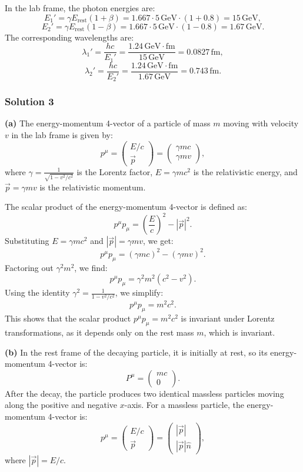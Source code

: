 \documentclass{article}
\begin{document}
In the lab frame, the photon energies are:
\[
E_1' = \gamma E_{\text{rest}}(1 + \beta) = 1.667 \cdot 5 \, \text{GeV} \cdot (1 + 0.8) = 15 \, \text{GeV},
\]
\[
E_2' = \gamma E_{\text{rest}}(1 - \beta) = 1.667 \cdot 5 \, \text{GeV} \cdot (1 - 0.8) = 1.67 \, \text{GeV}.
\]
The corresponding wavelengths are:
\[
\lambda_1' = \frac{hc}{E_1'} = \frac{1.24 \, \text{GeV} \cdot \text{fm}}{15 \, \text{GeV}} = 0.0827 \, \text{fm},
\]
\[
\lambda_2' = \frac{hc}{E_2'} = \frac{1.24 \, \text{GeV} \cdot \text{fm}}{1.67 \, \text{GeV}} = 0.743 \, \text{fm}.
\]

\subsubsection{Solution 3}
\textbf{(a)} The energy-momentum 4-vector of a particle of mass \(m\) moving with velocity \(v\) in the lab frame is given by:
\[
p^\mu = \begin{pmatrix} E/c \\ \vec{p} \end{pmatrix} = \begin{pmatrix} \gamma mc \\ \gamma mv \end{pmatrix},
\]
where \(\gamma = \frac{1}{\sqrt{1-v^2/c^2}}\) is the Lorentz factor, \(E = \gamma mc^2\) is the relativistic energy, and \(\vec{p} = \gamma mv\) is the relativistic momentum.

The scalar product of the energy-momentum 4-vector is defined as:
\[
p^\mu p_\mu = \left(\frac{E}{c}\right)^2 - |\vec{p}|^2.
\]
Substituting \(E = \gamma mc^2\) and \(|\vec{p}| = \gamma mv\), we get:
\[
p^\mu p_\mu = \left(\gamma mc\right)^2 - \left(\gamma mv\right)^2.
\]
Factoring out \(\gamma^2m^2\), we find:
\[
p^\mu p_\mu = \gamma^2m^2 \left(c^2 - v^2\right).
\]
Using the identity \(\gamma^2 = \frac{1}{1-v^2/c^2}\), we simplify:
\[
p^\mu p_\mu = m^2c^2.
\]
This shows that the scalar product \(p^\mu p_\mu = m^2c^2\) is invariant under Lorentz transformations, as it depends only on the rest mass \(m\), which is invariant.

\textbf{(b)} In the rest frame of the decaying particle, it is initially at rest, so its energy-momentum 4-vector is:
\[
P^\mu = \begin{pmatrix} mc \\ 0 \end{pmatrix}.
\]
After the decay, the particle produces two identical massless particles moving along the positive and negative \(x\)-axis. For a massless particle, the energy-momentum 4-vector is:
\[
p^\mu = \begin{pmatrix} E/c \\ \vec{p} \end{pmatrix} = \begin{pmatrix} |\vec{p}| \\ |\vec{p}| \hat{n} \end{pmatrix},
\]
where \(|\vec{p}| = E/c\).
\end{document}
